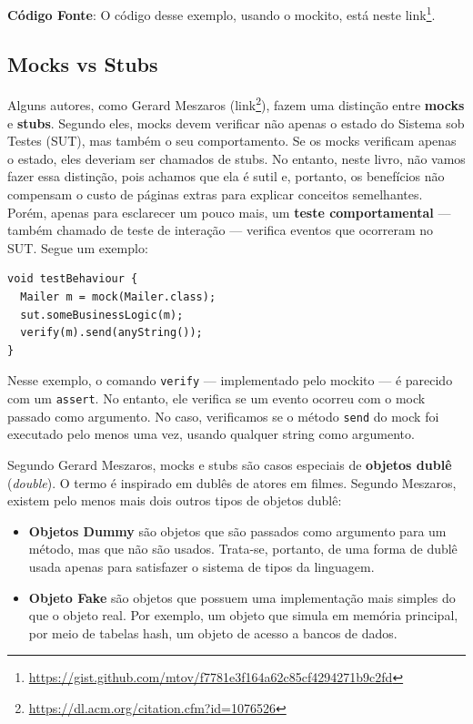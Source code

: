 \documentclass[
  11pt,
  twoside]{book}
\newcommand{\passthrough}[1]{#1}
\DeclareRobustCommand{\href}[2]{#2\footnote{\url{#1}}}
\begin{document}
\textbf{Código Fonte}: O código desse exemplo, usando o mockito, está
neste
\href{https://gist.github.com/mtov/f7781e3f164a62c85cf4294271b9c2fd}{link}.

\hypertarget{mocks-vs-stubs}{%
\subsection{Mocks vs Stubs}\label{mocks-vs-stubs}}

 

 Alguns autores, como Gerard Meszaros
(\href{https://dl.acm.org/citation.cfm?id=1076526}{link}), fazem uma
distinção entre \textbf{mocks} e \textbf{stubs}. Segundo eles, mocks
devem verificar não apenas o estado do Sistema sob Testes (SUT), mas
também o seu comportamento. Se os mocks verificam apenas o estado, eles
deveriam ser chamados de stubs. No entanto, neste livro, não vamos fazer
essa distinção, pois achamos que ela é sutil e, portanto, os benefícios
não compensam o custo de páginas extras para explicar conceitos
semelhantes. Porém, apenas para esclarecer um pouco mais, um
\textbf{teste comportamental} --- também chamado de teste de interação
--- verifica eventos que ocorreram no SUT. Segue um exemplo:

\begin{lstlisting}
void testBehaviour {
  Mailer m = mock(Mailer.class);
  sut.someBusinessLogic(m);
  verify(m).send(anyString());
}
\end{lstlisting}

Nesse exemplo, o comando \passthrough{\lstinline!verify!} ---
implementado pelo mockito --- é parecido com um
\passthrough{\lstinline!assert!}. No entanto, ele verifica se um evento
ocorreu com o mock passado como argumento. No caso, verificamos se o
método \passthrough{\lstinline!send!} do mock foi executado pelo menos
uma vez, usando qualquer string como argumento.

  Segundo Gerard
Meszaros, mocks e stubs são casos especiais de \textbf{objetos dublê}
(\emph{double}). O termo é inspirado em dublês de atores em filmes.
Segundo Meszaros, existem pelo menos mais dois outros tipos de objetos
dublê:

\begin{itemize}
\item
  \textbf{Objetos Dummy} são objetos que são passados como argumento
  para um método, mas que não são usados. Trata-se, portanto, de uma
  forma de dublê usada apenas para satisfazer o sistema de tipos da
  linguagem.
\item
  \textbf{Objeto Fake} são objetos que possuem uma implementação mais
  simples do que o objeto real. Por exemplo, um objeto que simula em
  memória principal, por meio de tabelas hash, um objeto de acesso a
  bancos de dados.
\end{itemize}
\end{document}
